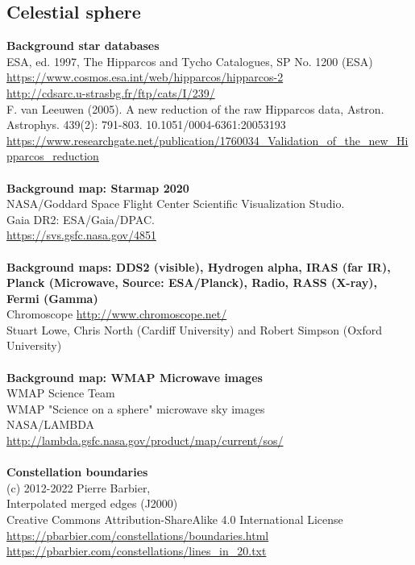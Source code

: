 \documentclass[Orbiter User Manual.tex]{subfiles}
\begin{document}
\subsection{Celestial sphere}
\textbf{Background star databases}\\
ESA, ed. 1997, The Hipparcos and Tycho Catalogues, SP No. 1200 (ESA)\\
\url{https://www.cosmos.esa.int/web/hipparcos/hipparcos-2}\\
\url{http://cdsarc.u-strasbg.fr/ftp/cats/I/239/}\\
F. van Leeuwen (2005). A new reduction of the raw Hipparcos data, Astron. Astrophys. 439(2): 791-803. 10.1051/0004-6361:20053193\\
\url{https://www.researchgate.net/publication/1760034_Validation_of_the_new_Hipparcos_reduction}\\
\\
\textbf{Background map: Starmap 2020}\\
NASA/Goddard Space Flight Center Scientific Visualization Studio.\\
Gaia DR2: ESA/Gaia/DPAC.\\
\url{https://svs.gsfc.nasa.gov/4851}\\
\\
\textbf{Background maps: DDS2 (visible), Hydrogen alpha, IRAS (far IR), Planck (Microwave, Source: ESA/Planck), Radio, RASS (X-ray), Fermi (Gamma)}\\
Chromoscope \url{http://www.chromoscope.net/}\\
Stuart Lowe, Chris North (Cardiff University) and Robert Simpson (Oxford University)\\
\\
\textbf{Background map: WMAP Microwave images}\\
WMAP Science Team\\
WMAP "Science on a sphere" microwave sky images\\
NASA/LAMBDA\\
\url{http://lambda.gsfc.nasa.gov/product/map/current/sos/}\\
\\
\textbf{Constellation boundaries}\\
(c) 2012-2022 Pierre Barbier,\\
Interpolated merged edges (J2000)\\
Creative Commons Attribution-ShareAlike 4.0 International License\\
\url{https://pbarbier.com/constellations/boundaries.html}\\
\url{https://pbarbier.com/constellations/lines_in_20.txt}\\
\end{document}

